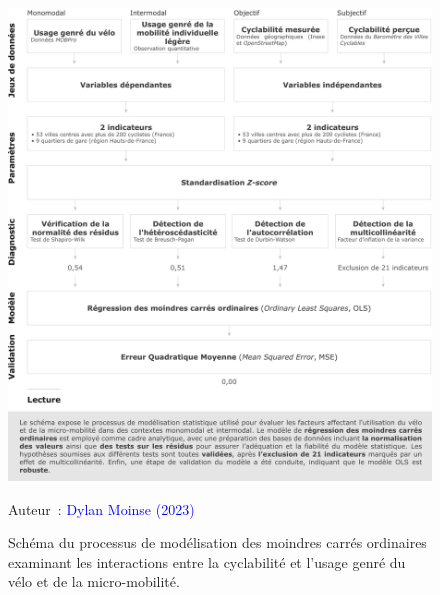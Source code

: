 \begin{refsegment}
    \begin{figure}[h!]\vspace*{4pt}
        \caption{Schéma du processus de modélisation des moindres carrés ordinaires examinant les interactions entre la cyclabilité et l'usage genré du vélo et de la micro-mobilité.}
        \label{fig-chap4:schema-methodologie-ols}
        \centerline{\includegraphics[width=1\columnwidth]{src/Figures/Chap-4/FR_Schema_Methodologie_OLS.pdf}}
        \vspace{5pt}
        \begin{flushright}\scriptsize{
        Auteur~: \textcolor{blue}{Dylan Moinse (2023)}
        }\end{flushright}
    \end{figure}


\end{refsegment}
